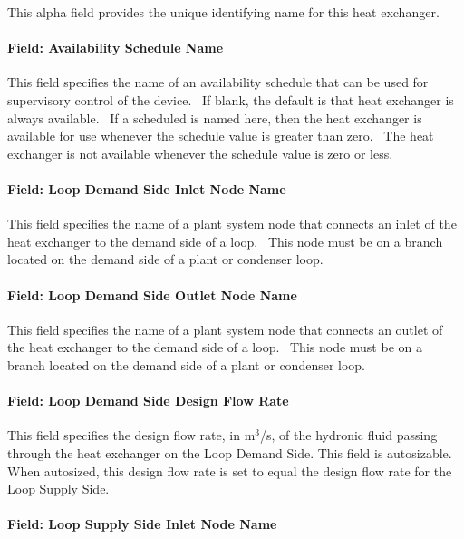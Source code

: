 This alpha field provides the unique identifying name for this heat exchanger.

\paragraph{Field: Availability Schedule Name}\label{field-availability-schedule-name-001}

This field specifies the name of an availability schedule that can be used for supervisory control of the device.~ If blank, the default is that heat exchanger is always available.~ If a scheduled is named here, then the heat exchanger is available for use whenever the schedule value is greater than zero.~ The heat exchanger is not available whenever the schedule value is zero or less.

\paragraph{Field: Loop Demand Side Inlet Node Name}\label{field-loop-demand-side-inlet-node-name}

This field specifies the name of a plant system node that connects an inlet of the heat exchanger to the demand side of a loop.~ This node must be on a branch located on the demand side of a plant or condenser loop.

\paragraph{Field: Loop Demand Side Outlet Node Name}\label{field-loop-demand-side-outlet-node-name}

This field specifies the name of a plant system node that connects an outlet of the heat exchanger to the demand side of a loop.~ This node must be on a branch located on the demand side of a plant or condenser loop.

\paragraph{Field: Loop Demand Side Design Flow Rate}\label{field-loop-demand-side-design-flow-rate}

This field specifies the design flow rate, in m\(^{3}\)/s, of the hydronic fluid passing through the heat exchanger on the Loop Demand Side. This field is autosizable. When autosized, this design flow rate is set to equal the design flow rate for the Loop Supply Side.

\paragraph{Field: Loop Supply Side Inlet Node Name}\label{field-loop-supply-side-inlet-node-name}


